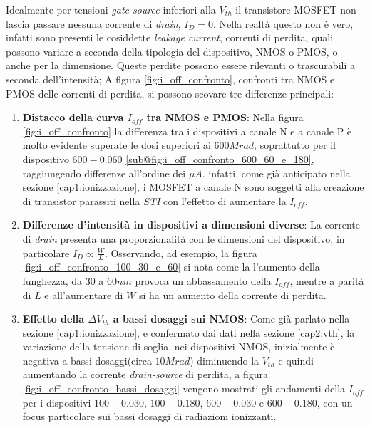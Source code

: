 Idealmente per tensioni \textit{gate-source} inferiori alla $V_{th}$ il transistore MOSFET non lascia passare nessuna corrente di \textit{drain}, $I_D = 0$. Nella realtà questo non è vero, infatti sono presenti le cosiddette \textit{leakage current}, correnti di perdita, quali possono variare a seconda della tipologia del dispositivo, NMOS o PMOS, o anche per la dimensione.
Queste perdite possono essere rilevanti o trascurabili a seconda dell'intensità; A figura \ref{fig:i_off_confronto}, confronti tra NMOS e PMOS delle correnti di perdita, si possono scovare tre differenze principali:
\begin{enumerate}
    \item \textbf{Distacco della curva $I_{off}$ tra NMOS e PMOS}: Nella figura \ref{fig:i_off_confronto} la differenza tra i dispositivi a canale N e a canale P è molto evidente superate le dosi superiori ai $600Mrad$, soprattutto per il dispositivo $600-0.060$ \ref{sub@fig:i_off_confronto_600_60_e_180}, raggiungendo differenze all'ordine dei $\mu A$. infatti, come già anticipato nella sezione \ref{cap1:ionizzazione}, i MOSFET a canale N sono soggetti alla creazione di transistor parassiti nella \textit{STI} con l'effetto di aumentare la $I_{off}$.
    
    \item \textbf{Differenze d'intensità in dispositivi a dimensioni diverse}: La corrente di \textit{drain} presenta una proporzionalità con le dimensioni del dispositivo, in particolare $I_{D} \propto \frac{W}{L}$. Osservando, ad esempio, la figura \ref{fig:i_off_confronto_100_30_e_60} si nota come la l'aumento della lunghezza, da $30 \text{ a } 60nm$ provoca un abbassamento della $I_{off}$, mentre a parità di $L$ e all'aumentare di $W$ si ha un aumento della corrente di perdita.
    
    \item \textbf{Effetto della $ \Delta V_{th}$ a bassi dosaggi sui NMOS}: Come già parlato nella sezione \ref{cap1:ionizzazione}, e confermato dai dati nella sezione \ref{cap2:vth}, la variazione della tensione di soglia, nei dispositivi NMOS, inizialmente è negativa a bassi dosaggi(circa $10Mrad$) diminuendo la $V_{th}$ e quindi aumentando la corrente \textit{drain-source} di perdita, a figura \ref{fig:i_off_confronto_bassi_dosaggi} vengono mostrati gli andamenti della $I_{off}$ per i dispositivi $100-0.030$, $100-0.180$, $600-0.030$ e $600-0.180$, con un focus particolare sui bassi dosaggi di radiazioni ionizzanti.
\end{enumerate}


